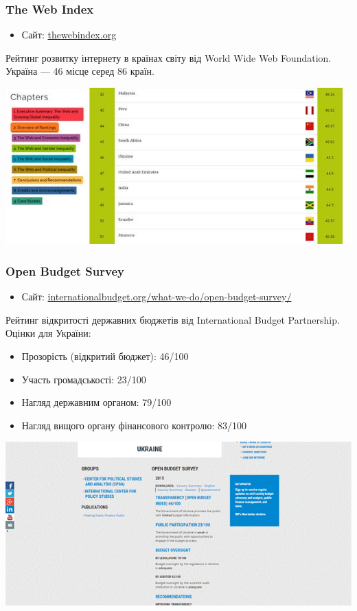 \subsubsection{The Web Index}

\begin{itemize}
    \item Сайт: \href{http://thewebindex.org/}{thewebindex.org}
\end{itemize}

Рейтинг розвитку інтернету в країнах світу від World Wide Web Foundation. Україна — 46 місце серед 86 країн.

\includegraphics{images/014.jpg}

\subsubsection{Open Budget Survey}

\begin{itemize}
    \item Сайт: \href{http://internationalbudget.org/what-we-do/open-budget-survey/}{internationalbudget.org/what-we-do/open-budget-survey/}
\end{itemize}

Рейтинг відкритості державних бюджетів від International Budget Partnership. Оцінки для України:
\begin{itemize}
    \item Прозорість (відкритий бюджет): 46/100
    \item Участь громадськості: 23/100
    \item Нагляд державним органом: 79/100
    \item Нагляд вищого органу фінансового контролю: 83/100
\end{itemize}

\includegraphics{images/015.gif}

